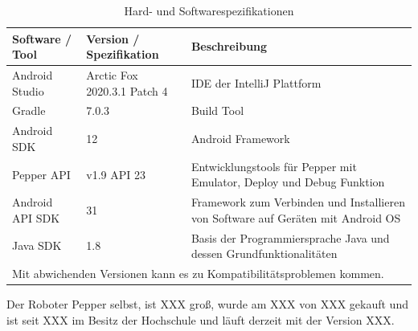 \begin{table}[H]
    \caption{Hard- und Softwarespezifikationen}
    \label{table}
    \setlength{\tabcolsep}{3pt}
    \begin{tabular}{|p{100pt}|p{120pt}|p{180pt}|}
        \hline
        Software / Tool & Version / Spezifikation     & Beschreibung                                                                     \\
        \hline\hline
        Android Studio  & Arctic Fox 2020.3.1 Patch 4 & IDE der IntelliJ Plattform                                                       \\
        \hline
        Gradle          & 7.0.3                       & Build Tool                                                                       \\
        \hline
        Android SDK     & 12                          & Android Framework                                                                \\
        \hline
        Pepper API      & v1.9  API 23                & Entwicklungstools für Pepper mit Emulator, Deploy und Debug Funktion             \\
        \hline
        Android API SDK & 31                          & Framework zum Verbinden und Installieren von Software auf Geräten mit Android OS \\
        \hline
        Java SDK        & 1.8                         & Basis der Programmiersprache Java und dessen Grundfunktionalitäten               \\
        \hline
        \multicolumn{3}{p{380pt}}{Mit abwichenden Versionen kann es zu Kompatibilitätsproblemen kommen.}
    \end{tabular}
    \label{tab1}
\end{table}


Der Roboter Pepper selbst, ist XXX groß, wurde am XXX von XXX gekauft und ist seit XXX im Besitz der Hochschule
und läuft derzeit mit der Version XXX.


